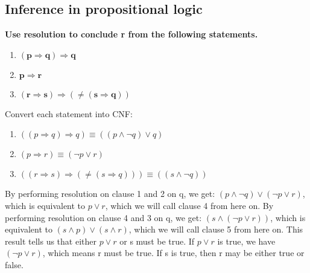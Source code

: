 \subsection{Inference in propositional logic}
\begin{large}
    \textbf{Use resolution to conclude r from the following statements.}
    \begin{enumerate}
        \item $ \mathbf{(p \Rightarrow q) \Rightarrow q }$
        \item $ \mathbf{p \Rightarrow r }$
        \item $ \mathbf{(r \Rightarrow s) \Rightarrow (\neq (s \Rightarrow q))} $
    \end{enumerate}
    Convert each statement into CNF\@:
    \begin{enumerate}
        \item $ ((p \Rightarrow q) \Rightarrow q) \equiv ((p \land \neg q) \lor q) $
        \item $ (p \Rightarrow r) \equiv (\neg p \lor r) $
        \item $ ((r \Rightarrow s) \Rightarrow (\neq (s \Rightarrow q))) \equiv ((s \land \neg q))$
    \end{enumerate}
    By performing resolution on clause 1 and 2 on q, we get:
    $ (p \land \neg q) \lor (\neg p \lor r)  $, which is equivalent to $ p \lor r $, which we will call clause 4 from here on.
    By performing resolution on clause 4 and 3 on q, we get:
    $ (s \land (\neg p \lor r)) $, which is equivalent to $ (s \land p) \lor (s \land r) $, which we will call clause 5 from here on.
    This result tells us that either $ p \lor r $ or s must be true.
    If $ p \lor r $ is true, we have $ (\neg p \lor r) $, which means r must be true.
    If s is true, then r may be either true or false.
\end{large}